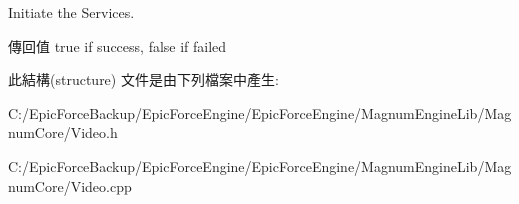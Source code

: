 Initiate the Services. 

\begin{DoxyReturn}{傳回值}
true if success, false if failed 
\end{DoxyReturn}


此結構(structure) 文件是由下列檔案中產生\+:\begin{DoxyCompactItemize}
\item 
C\+:/\+Epic\+Force\+Backup/\+Epic\+Force\+Engine/\+Epic\+Force\+Engine/\+Magnum\+Engine\+Lib/\+Magnum\+Core/Video.\+h\item 
C\+:/\+Epic\+Force\+Backup/\+Epic\+Force\+Engine/\+Epic\+Force\+Engine/\+Magnum\+Engine\+Lib/\+Magnum\+Core/Video.\+cpp\end{DoxyCompactItemize}
